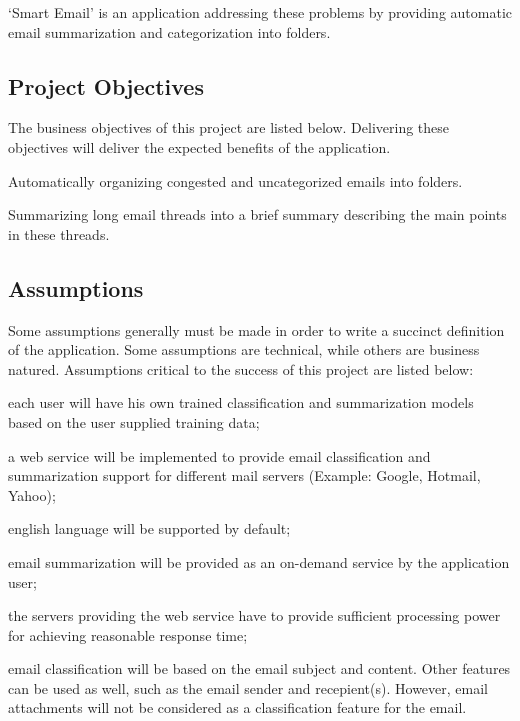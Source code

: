 \documentclass[a4paper,10pt]{article}
\newenvironment{my_itemize}
{\begin{itemize}
  \setlength{\itemsep}{0cm}
  \setlength{\parskip}{0cm}}
{\end{itemize}}
\begin{document}
`Smart Email' is an application addressing these problems by providing automatic 
email summarization and categorization into folders.

\subsection{Project Objectives}
The business objectives of this project are listed below. Delivering these 
objectives will deliver the expected benefits of the application.
\begin{my_itemize}
  \item Automatically organizing congested and uncategorized emails into folders.
  \item Summarizing long email threads into a brief summary describing the 
	main points in these threads.
\end{my_itemize}


\subsection{Assumptions}
Some assumptions generally must be made in order to write a succinct definition 
of the application. Some assumptions are technical, while others are business natured.  Assumptions 
critical to the success of this project are listed below:
\begin{my_itemize}
  \item each user will have his own trained classification and summarization 
	models based on the user supplied training data;
  \item a web service will be implemented to provide email 
	classification and summarization support for different mail 
	servers (Example: Google, Hotmail, Yahoo);
  \item english language will be supported by default;
  \item email summarization will be provided as an on-demand service by the application user;
  \item the servers providing the web service have to provide sufficient 
	processing power for achieving reasonable response time;
  \item email classification will be based on the email subject and content. 
	Other features can be used as well, such as the email sender and recepient(s). 
	However, email attachments will not be considered as a classification feature for the email.
\end{my_itemize}
\end{document}
